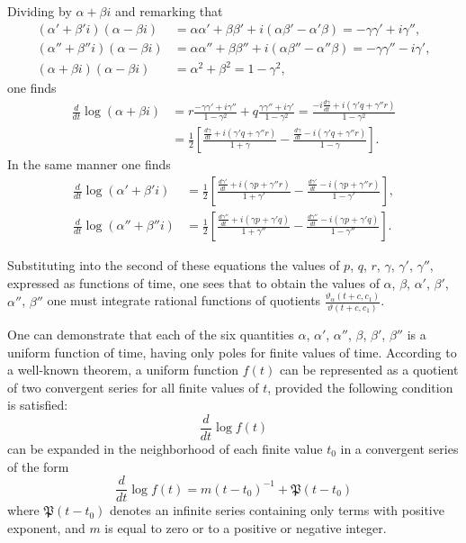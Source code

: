 \documentclass{article}
\begin{document}
Dividing by $\alpha + \beta i$ and remarking that
\begin{align*}
(\alpha' + \beta'i)(\alpha - \beta i) &= \alpha\alpha' + \beta\beta' + i(\alpha\beta' - \alpha'\beta) = -\gamma\gamma' + i\gamma'', \\
(\alpha'' + \beta''i)(\alpha - \beta i) &= \alpha\alpha'' + \beta\beta'' + i(\alpha\beta'' - \alpha''\beta) = -\gamma\gamma'' - i\gamma', \\
(\alpha + \beta i)(\alpha - \beta i) &= \alpha^2 + \beta^2 = 1 - \gamma^2,
\end{align*}
one finds
\begin{align*}
\frac{d}{dt}\log(\alpha + \beta i) &= r\frac{-\gamma\gamma' + i\gamma''}{1 - \gamma^2} + q\frac{\gamma\gamma'' + i\gamma'}{1 - \gamma^2} = \frac{-i\frac{d\gamma}{dt} + i(\gamma'q + \gamma''r)}{1 - \gamma^2} \\
&= \frac{1}{2}\left[\frac{\frac{d\gamma}{dt} + i(\gamma'q + \gamma''r)}{1 + \gamma} - \frac{\frac{d\gamma}{dt} - i(\gamma'q + \gamma''r)}{1 - \gamma}\right].
\end{align*}
In the same manner one finds
\begin{align*}
\frac{d}{dt}\log(\alpha' + \beta'i) &= \frac{1}{2}\left[\frac{\frac{d\gamma'}{dt} + i(\gamma p + \gamma''r)}{1 + \gamma'} - \frac{\frac{d\gamma'}{dt} - i(\gamma p + \gamma''r)}{1 - \gamma'}\right], \\
\frac{d}{dt}\log(\alpha'' + \beta''i) &= \frac{1}{2}\left[\frac{\frac{d\gamma''}{dt} + i(\gamma p + \gamma'q)}{1 + \gamma''} - \frac{\frac{d\gamma''}{dt} - i(\gamma p + \gamma'q)}{1 - \gamma''}\right].
\end{align*}

Substituting into the second of these equations the values of $p$, $q$, $r$, $\gamma$, $\gamma'$, $\gamma''$, expressed as functions of time, one sees that to obtain the values of $\alpha$, $\beta$, $\alpha'$, $\beta'$, $\alpha''$, $\beta''$ one must integrate rational functions of quotients $\frac{\vartheta_\alpha(t + c, c_1)}{\vartheta(t + c, c_1)}$.

One can demonstrate that each of the six quantities $\alpha$, $\alpha'$, $\alpha''$, $\beta$, $\beta'$, $\beta''$ is a uniform function of time, having only poles for finite values of time.
According to a well-known theorem, a uniform function $f(t)$ can be represented as a quotient of two convergent series for all finite values of $t$, provided the following condition is satisfied:
\[
\frac{d}{dt}\log f(t)
\]
can be expanded in the neighborhood of each finite value $t_0$ in a convergent series of the form
\[
\frac{d}{dt}\log f(t) = m(t - t_0)^{-1} + \mathfrak{P}(t - t_0)
\]
where $\mathfrak{P}(t - t_0)$ denotes an infinite series containing only terms with positive exponent, and $m$ is equal to zero or to a positive or negative integer.
\end{document}
